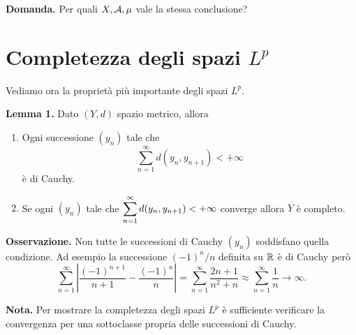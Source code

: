 \textbf{Domanda.} Per quali $X,\mathcal{A},\mu$ vale la stessa conclusione?


\section{Completezza degli spazi $L^p$}

Vediamo ora la proprietà più importante degli spazi $L^p$.


\hypertarget{prop:completeness_lemma_1}{}
\textbf{Lemma 1.} 
Dato $(Y, d)$ spazio metrico, allora
\begin{enumerate}
	\item
		Ogni successione $(y_n)$ tale che
		$$
		\sum^{\infty}_{n=1} d(y_n, y_{n+1}) < +\infty
		$$
		è di Cauchy.

	\item \label{item:def_completeness_1}
		Se ogni $(y_n)$ tale che $\displaystyle \sum^{\infty}_{n=1} d(y_n, y_{n+1}) < +\infty$ converge allora $Y$ è completo.
\end{enumerate}

\textbf{Osservazione.} Non tutte le successioni di Cauchy $(y_n)$ soddisfano quella condizione. Ad esempio la successione $(-1)^n / n$ definita su $\mathbb R$ è di Cauchy però
$$
\sum_{n=1}^\infty \left| \frac{(-1)^{n+1}}{n+1} - \frac{(-1)^n}{n} \right| 
= \sum_{n=1}^\infty \frac{2n + 1}{n^2 + n}
\approx \sum_{n=1}^\infty \frac{1}{n} \to \infty.
$$

\textbf{Nota.} Per mostrare la completezza degli spazi $L^p$ è sufficiente verificare la convergenza per una sottoclasse propria delle successioni di Cauchy.

